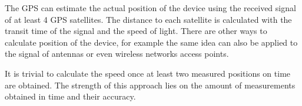 The GPS can estimate the actual position of the device using the received signal
of at least 4 GPS satellites. The distance to each satellite is calculated with
the transit time of the signal and the speed of light. There are other ways to 
calculate position of the device, for example the same idea can also be applied 
to the signal of antennas or even wireless networks access points.

It is trivial to calculate the speed once at least two measured
positions on time are obtained. The strength of this approach lies on the amount of
measurements obtained in time and their accuracy.

